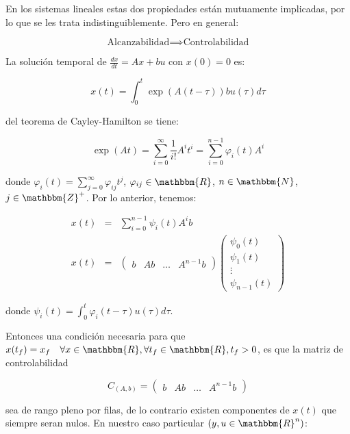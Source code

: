 \documentclass[12pt]{article}
\numberwithin{equation}{subsection}
\begin{document}
En los sistemas lineales estas dos propiedades están mutuamente implicadas, por lo que se les trata indistinguiblemente. Pero en general:

\begin{equation}
\text{Alcanzabilidad} \implies \text{Controlabilidad}
\end{equation}

La solución temporal de $\frac{dx}{dt} = Ax + bu$ con $x(0) = 0$ es:

\begin{equation}
x(t) = \int_0^t \exp{(A(t - \tau))} b u(\tau) d \tau
\end{equation}

del teorema de Cayley-Hamilton se tiene:

\begin{equation}
\exp{(A t)} = \sum\limits_{i=0}^{\infty} \frac{1}{i!} A^i t^i = \sum\limits_{i=0}^{n-1} \varphi_i(t) A^i
\end{equation}

donde $\varphi_i(t) = \sum\limits_{j=0}^{\infty} \varphi_{ij} t^j$, $\varphi_{ij} \in \mathbbm{R}$, $n \in \mathbbm{N}$, $j \in \mathbbm{Z}^+$. Por lo anterior, tenemos:

\begin{eqnarray}
x(t) & = & \sum\limits_{i=0}^{n-1} \psi_i(t) A^i b \nonumber \\
x(t) & = &
\begin{pmatrix}
b & A b & \dots & A^{n-1} b
\end{pmatrix}
\begin{pmatrix}
\psi_0(t) \\
\psi_1(t) \\
\vdots \\
\psi_{n-1}(t)
\end{pmatrix}
\end{eqnarray}

donde $\psi_i(t) = \int_0^t \varphi_i (t - \tau) u(\tau) d \tau$.

Entonces una condición necesaria para que $x(t_f) = x_f \quad \forall x \in \mathbbm{R}, \forall t_f \in \mathbbm{R}, t_f > 0$, es que la matriz de controlabilidad

\begin{equation}
C_{(A,b)} =
\begin{pmatrix}
b & Ab & \dots & A^{n-1}b
\end{pmatrix}
\end{equation}

sea de rango pleno por filas, de lo contrario existen componentes de $x(t)$ que siempre seran nulos. En nuestro caso particular $\left( y, u \in \mathbbm{R}^n \right)$:
\end{document}
